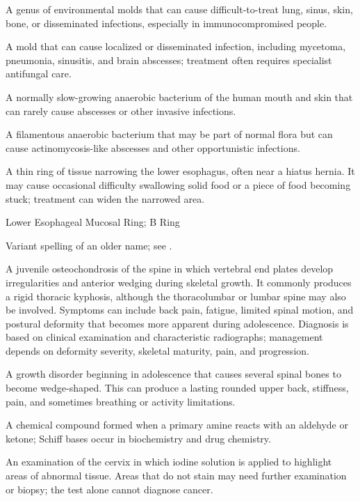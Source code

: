  A genus of environmental molds that can cause difficult-to-treat lung, sinus, skin, bone, or disseminated infections, especially in immunocompromised people.

 A mold that can cause localized or disseminated infection, including mycetoma, pneumonia, sinusitis, and brain abscesses; treatment often requires specialist antifungal care.

 A normally slow-growing anaerobic bacterium of the human mouth and skin that can rarely cause abscesses or other invasive infections.

 A filamentous anaerobic bacterium that may be part of normal flora but can cause actinomycosis-like abscesses and other opportunistic infections.

 A thin ring of tissue narrowing the lower esophagus, often near a hiatus hernia. It may cause occasional difficulty swallowing solid food or a piece of food becoming stuck; treatment can widen the narrowed area.

\synonyms
Lower Esophageal Mucosal Ring; B Ring

 Variant spelling of an older name; see .

 A juvenile osteochondrosis of the spine in which vertebral end plates develop irregularities and anterior wedging during skeletal growth.
It commonly produces a rigid thoracic kyphosis, although the thoracolumbar or lumbar spine may also be involved.
Symptoms can include back pain, fatigue, limited spinal motion, and postural deformity that becomes more apparent during adolescence.
Diagnosis is based on clinical examination and characteristic radiographs; management depends on deformity severity, skeletal maturity, pain, and progression.

 A growth disorder beginning in adolescence that causes several spinal bones to become wedge-shaped. This can produce a lasting rounded upper back, stiffness, pain, and sometimes breathing or activity limitations.

 A chemical compound formed when a primary amine reacts with an aldehyde or ketone; Schiff bases occur in biochemistry and drug chemistry.

 An examination of the cervix in which iodine solution is applied to highlight areas of abnormal tissue. Areas that do not stain may need further examination or biopsy; the test alone cannot diagnose cancer.

